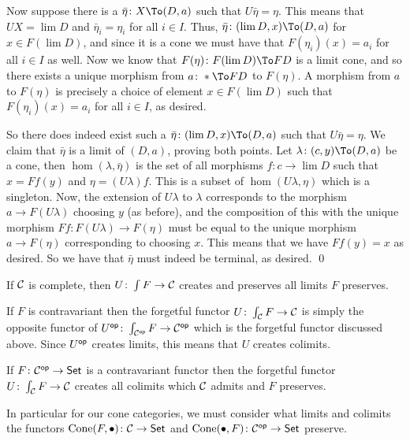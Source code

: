     Now suppose there is a $\bar\eta\colon X\To(D,a)$ such that $U\bar\eta=\eta$.
    This means that $UX=\lim D$ and $\bar\eta_i=\eta_i$ for all $i\in I$.
    Thus, $\bar\eta\colon(\lim D,x)\To(D,a)$ for $x\in F(\lim D)$, and since it is a cone we must have that $F(\eta_i)(x)=a_i$ for all $i\in I$ as well.
    Now we know that $F(\eta)\colon F(\lim D)\To FD$ is a limit cone, and so there exists a unique morphism from $a\colon*\To FD$ to $F(\eta)$.
    A morphism from $a$ to $F(\eta)$ is precisely a choice of element $x\in F(\lim D)$ such that $F(\eta_i)(x)=a_i$ for all $i\in I$, as desired.

    So there does indeed exist such a $\bar\eta\colon(\lim D,x)\To(D,a)$ such that $U\bar\eta=\eta$.
    We claim that $\bar\eta$ is a limit of $(D,a)$, proving both points.
    Let $\lambda\colon(c,y)\To(D,a)$ be a cone, then $\hom(\lambda,\bar\eta)$ is the set of all morphisms $f\colon c\to\lim D$ such that $x=Ff(y)$ and $\eta=(U\lambda)f$.
    This is a subset of $\hom(U\lambda,\eta)$ which is a singleton.
    Now, the extension of $U\lambda$ to $\lambda$ corresponds to the morphism $a\to F(U\lambda)$ choosing $y$ (as before), and the composition of this with the unique morphism
    $Ff\colon F(U\lambda)\to F(\eta)$ must be equal to the unique morphism $a\to F(\eta)$ corresponding to choosing $x$.
    This means that we have $Ff(y)=x$ as desired.
    So we have that $\bar\eta$ must indeed be terminal, as desired.
    \qed

\eproof

\bcoro

    If ${{\cal C}}$ is complete, then $U\colon\int F\to{{\cal C}}$ creates and preserves all limits $F$ preserves.

\ecoro

If $F$ is contravariant then the forgetful functor $U\colon\int_{{\cal C}} F\to{{\cal C}}$ is simply the opposite functor of $U^{\sf op}\colon\int_{{{\cal C}}^{\sf op}}F\to{{\cal C}}^{\sf op}$ which is the forgetful
functor discussed above.
Since $U^{\sf op}$ creates limits, this means that $U$ creates colimits.

\bcoro

    If $F\colon{{\cal C}}^{\sf op}\to{\sf Set}$ is a contravariant functor then the forgetful functor $U\colon\int_{{\cal C}} F\to{{\cal C}}$ creates all colimits which ${{\cal C}}$ admits and $F$ preserves.

\ecoro

In particular for our cone categories, we must consider what limits and colimits the functors ${\rm Cone}(F,\bullet)\colon{{\cal C}}\to{\sf Set}$ and ${\rm Cone}(\bullet,F)\colon{{\cal C}}^{\sf op}\to{\sf Set}$ preserve.

